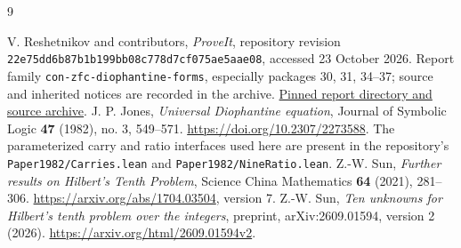 \documentclass[11pt,a4paper]{article}
\newcommand{\repoPin}{\texttt{22e75dd6b87b1b199bb08c778d7cf075ae5aae08}}
\theoremstyle{definition}
\theoremstyle{remark}
\numberwithin{equation}{section}
\begin{document}
\hypersetup{pageanchor=true}
\tableofcontents
\clearpage
{}







\clearpage
\begin{thebibliography}{9}
\raggedright
{}
V. Reshetnikov and contributors, \emph{ProveIt}, repository revision
\repoPin, accessed 23 October 2026.
Report family \texttt{con-zfc-diophantine-forms}, especially packages
30, 31, 34--37; source and inherited notices are recorded in the archive.
\href{https://github.com/VladimirReshetnikov/ProveIt/tree/22e75dd6b87b1b199bb08c778d7cf075ae5aae08/SetTheory/Cardinals/docs/reports/hilbert-tenth-problem/con-zfc-diophantine-forms}{Pinned report directory and source archive}.
J. P. Jones, \emph{Universal Diophantine equation}, Journal of Symbolic
Logic \textbf{47} (1982), no. 3, 549--571.
\url{https://doi.org/10.2307/2273588}.
The parameterized carry and ratio interfaces used here are present in
the repository's \texttt{Paper1982/Carries.lean} and
\texttt{Paper1982/NineRatio.lean}.
Z.-W. Sun, \emph{Further results on Hilbert's Tenth Problem}, Science
China Mathematics \textbf{64} (2021), 281--306.
\url{https://arxiv.org/abs/1704.03504}, version 7.
Z.-W. Sun, \emph{Ten unknowns for Hilbert's tenth problem over the
integers}, preprint, arXiv:2609.01594, version 2 (2026).
\url{https://arxiv.org/html/2609.01594v2}.
\end{thebibliography}
\end{document}
